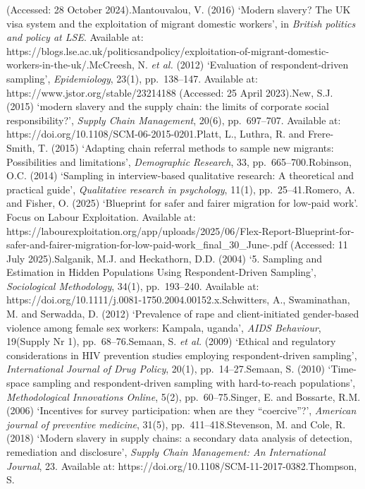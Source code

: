 \documentclass[
  12pt,
  letterpaper,
  DIV=11,
  numbers=noendperiod]{scrartcl}
\begin{document}
{{(Accessed: 28 October 2024).Mantouvalou, V. (2016) `Modern slavery? The
UK visa system and the exploitation of migrant domestic workers', in
\emph{British politics and policy at LSE}. Available at:
https://blogs.lse.ac.uk/politicsandpolicy/exploitation-of-migrant-domestic-workers-in-the-uk/.McCreesh,
N. \emph{et al.} (2012) `Evaluation of respondent-driven sampling',
\emph{Epidemiology}, 23(1), pp.~138--147. Available at:
https://www.jstor.org/stable/23214188 (Accessed: 25 April 2023).New,
S.J. (2015) `modern slavery and the supply chain: the limits of
corporate social responsibility?', \emph{Supply Chain Management},
20(6), pp.~697--707. Available at:
https://doi.org/10.1108/SCM-06-2015-0201.Platt, L., Luthra, R. and
Frere-Smith, T. (2015) `Adapting chain referral methods to sample new
migrants: Possibilities and limitations', \emph{Demographic Research},
33, pp.~665--700.Robinson, O.C. (2014) `Sampling in interview-based
qualitative research: A theoretical and practical guide',
\emph{Qualitative research in psychology}, 11(1), pp.~25--41.Romero, A.
and Fisher, O. (2025) `Blueprint for safer and fairer migration for
low-paid work'. Focus on Labour Exploitation. Available at:
https://labourexploitation.org/app/uploads/2025/06/Flex-Report-Blueprint-for-safer-and-fairer-migration-for-low-paid-work\_final\_30\_June-.pdf
(Accessed: 11 July 2025).Salganik, M.J. and Heckathorn, D.D. (2004) `5.
Sampling and Estimation in Hidden Populations Using Respondent-Driven
Sampling', \emph{Sociological Methodology}, 34(1), pp.~193--240.
Available at:
https://doi.org/10.1111/j.0081-1750.2004.00152.x.Schwitters, A.,
Swaminathan, M. and Serwadda, D. (2012) `Prevalence of rape and
client-initiated gender-based violence among female sex workers:
Kampala, uganda', \emph{AIDS Behaviour}, 19(Supply Nr 1),
pp.~68--76.Semaan, S. \emph{et al.} (2009) `Ethical and regulatory
considerations in HIV prevention studies employing respondent-driven
sampling', \emph{International Journal of Drug Policy}, 20(1),
pp.~14--27.Semaan, S. (2010) `Time-space sampling and respondent-driven
sampling with hard-to-reach populations', \emph{Methodological
Innovations Online}, 5(2), pp.~60--75.Singer, E. and Bossarte, R.M.
(2006) `Incentives for survey participation: when are they
``coercive''?', \emph{American journal of preventive medicine}, 31(5),
pp.~411--418.Stevenson, M. and Cole, R. (2018) `Modern slavery in supply
chains: a secondary data analysis of detection, remediation and
disclosure', \emph{Supply Chain Management: An International Journal},
23. Available at: https://doi.org/10.1108/SCM-11-2017-0382.Thompson, S.
}}
\end{document}
